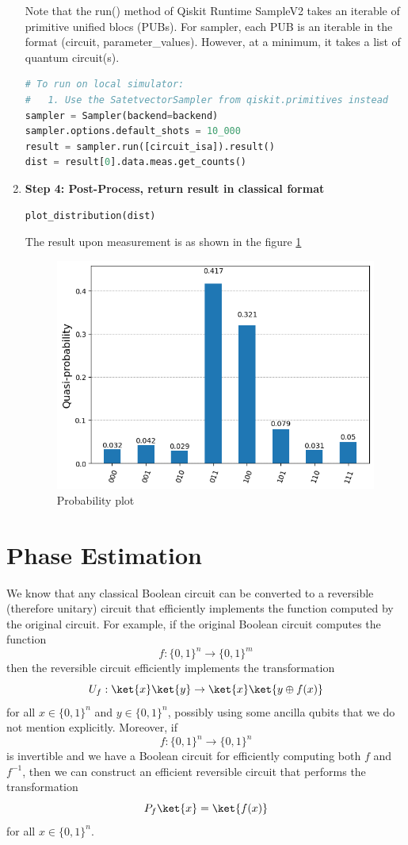 \documentclass[12pt, oneside]{book}
\theoremstyle{definition}
\theoremstyle{definition}
\theoremstyle{remark}
\begin{document}
\begin{enumerate}
Note that the run() method of Qiskit Runtime SampleV2 takes an iterable of primitive unified blocs (PUBs). For sampler, each PUB is an iterable in the format (circuit, parameter\_values). However, at a minimum, it takes a list of quantum circuit(s).
\begin{lstlisting}[language=Python]
# To run on local simulator:
#   1. Use the SatetvectorSampler from qiskit.primitives instead
sampler = Sampler(backend=backend)
sampler.options.default_shots = 10_000
result = sampler.run([circuit_isa]).result()
dist = result[0].data.meas.get_counts()    
\end{lstlisting}
\item \textbf{Step 4: Post-Process, return result in classical format}\\
\begin{lstlisting}[language=Python]
plot_distribution(dist)
\end{lstlisting}
The result upon measurement is as shown in the figure \ref{fig:grover_results}
\begin{figure}[H]
    \centering
    \includegraphics[width=0.7\linewidth]{../images/grover_result.png}
    \caption{Probability plot}
    \label{fig:grover_results}
\end{figure}
\end{enumerate}






\chapter{Phase Estimation}
We know that any classical Boolean circuit can be converted to a reversible (therefore unitary) circuit that efficiently implements the function computed by the original
circuit. For example, if the original Boolean circuit computes the function
\[
    f:\{0,1\}^n \rightarrow \{0,1\}^m
\]
then the reversible circuit efficiently implements the transformation
\[
    U_f:\ket{x}\ket{y} \rightarrow \ket{x}\ket{y\oplus f(x)}
\]
for all $x \in \{0,1\}^n$ and $y \in \{0,1\}^n$, possibly using some ancilla qubits that we do not
mention explicitly. Moreover, if 
\[
    f:\{0,1\}^n\rightarrow \{0,1\}^n 
\]
is invertible and we have a Boolean circuit for efficiently computing both $f$ and $f^{-1}$, then we can construct an efficient reversible circuit that performs the transformation
\[
P_f\ket{x}=\ket{f(x)}
\]
for all $x \in \{0,1\}^n$. 
\end{document}

